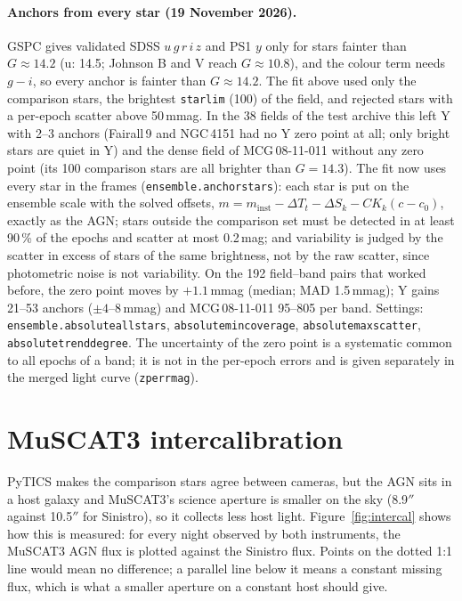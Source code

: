 \documentclass[10pt,a4paper,oneside]{report}
\renewcommand{\_}{\oldunderscore\allowbreak}
\begin{document}
\paragraph{Anchors from every star (19 November 2026).} GSPC gives validated SDSS $u\,g\,r\,i\,z$ and PS1 $y$
only for stars fainter than $G\approx14.2$ (u: 14.5; Johnson B and V reach $G\approx10.8$), and the colour
term needs $g-i$, so every anchor is fainter than $G\approx14.2$. The fit above used only the comparison
stars, the brightest \texttt{star\_lim} (100) of the field, and rejected stars with a per-epoch scatter
above 50\,mmag. In the 38 fields of the test archive this left Y with 2--3 anchors (Fairall\,9 and
NGC\,4151 had no Y zero point at all; only bright stars are quiet in Y) and the dense field of
MCG\,08-11-011 without any zero point (its 100 comparison stars are all brighter than $G=14.3$). The fit
now uses every star in the frames (\texttt{ensemble.anchor\_stars}): each star is put on the ensemble scale
with the solved offsets, $m=m_\mathrm{inst}-\Delta T_t-\Delta S_k-CK_k(c-c_0)$, exactly as the AGN; stars
outside the comparison set must be detected in at least 90\,\% of the epochs and scatter at most 0.2\,mag;
and variability is judged by the scatter in excess of stars of the same brightness, not by the raw scatter,
since photometric noise is not variability. On the 192 field--band pairs that worked before, the zero point
moves by $+1.1$\,mmag (median; MAD 1.5\,mmag); Y gains 21--53 anchors ($\pm4$--8\,mmag) and MCG\,08-11-011
95--805 per band. Settings: \texttt{ensemble.absolute\_all\_stars}, \texttt{absolute\_min\_coverage},
\texttt{absolute\_max\_scatter}, \texttt{absolute\_trend\_degree}. The uncertainty of the zero point is a
systematic common to all epochs of a band; it is not in the per-epoch errors and is given separately in the
merged light curve (\texttt{zp\_err\_mag}).

\section{MuSCAT3 intercalibration}

PyTICS makes the comparison stars agree between cameras, but the AGN sits in a host galaxy and MuSCAT3's
science aperture is smaller on the sky (8.9$''$ against 10.5$''$ for Sinistro), so it collects less host
light. Figure~\ref{fig:intercal} shows how this is measured: for every night observed by both instruments,
the MuSCAT3 AGN flux is plotted against the Sinistro flux. Points on the dotted 1:1 line would mean no
difference; a parallel line below it means a constant missing flux, which is what a smaller aperture on
a constant host should give.
\end{document}
